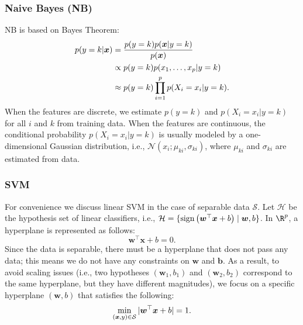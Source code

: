     \subsubsection{Naive Bayes (NB)}
        NB is based on Bayes Theorem: 
            \begin{equation}
                \begin{aligned}
                    p(y=k | \bm{x}) & = \frac{p(y=k) p(\bm{x} | y=k)}{p(\bm{x})} \\
                    & \propto p(y=k) p(x_1, \ldots, x_{p} | y=k) \\
                    & \approx p(y=k) \prod_{i=1}^{p}{p(X_i = x_i | y=k)}.
                \end{aligned}
            \end{equation}
        When the features are discrete, we estimate $p(y=k)$ and $p(X_i = x_i | y=k)$ for all $i$ and $k$ from training data.
        When the features are continuous, the conditional probability $p(X_i = x_i | y=k)$ is usually modeled by a one-dimensional Gaussian distribution, i.e., $\mathcal{N}(x_i; \mu_{ki}, \sigma_{ki})$, where $\mu_{ki}$ and $\sigma_{ki}$ are estimated from data.
        
    \subsubsection{SVM}
        For convenience we discuss linear SVM in the case of separable data $\mathcal{S}$.
        Let $\mathcal{H}$ be the hypothesis set of linear classifiers, i.e., $\mathcal{H}=\{ \text{sign}\left(\bm{w}^\top \bm{x} + b \right) \mid \bm{w}, b \}$.
        In $\R^\nfeat$, a hyperplane is represented as follows:
            \begin{equation}
                \bm{w}^\top \bm{x} + b = 0.
            \end{equation}
        Since the data is separable, there must be a hyperplane that does not pass any data; this means we do not have any constraints on $\bm{w}$ and $\bm{b}$.
        As a result, to avoid scaling issues (i.e., two hypotheses $(\bm{w}_1, b_1)$ and $(\bm{w}_2, b_2)$ correspond to the same hyperplane, but they have different magnitudes), we focus on a specific hyperplane $(\bm{w}, b)$ that satisfies the following:
            \begin{equation}
                \min_{(\bm{x}, y) \in \mathcal{S}} | \bm{w}^\top \bm{x} + b | = 1.
            \end{equation}
        
